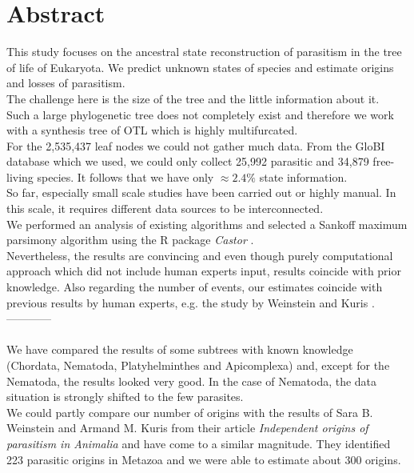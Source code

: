 \chapter*{Abstract}
  This study focuses on the ancestral state reconstruction of parasitism in the tree of life of
    Eukaryota. We predict unknown states of species and estimate origins and losses of parasitism. \\
  The challenge here is the size of the tree and the little information about it. \\
  Such a large phylogenetic tree does not completely exist and therefore we work with a synthesis 
    tree of OTL \cite{Hinchliff2015} which is highly multifurcated. \\
  For the 2,535,437 leaf nodes we could not gather much data. From the GloBI database 
    \cite{Poelen2014} which we used, we could only collect 25,992 parasitic and 34,879 
    free-living species. It follows that we have only $\approx 2.4\%$ state information. \\
  So far, especially small scale studies have been carried out or highly manual. In this scale, it 
    requires different data sources to be interconnected. \\
  We performed an analysis of existing algorithms and selected a Sankoff maximum parsimony algorithm 
    using the R package \textit{Castor} \cite{Louca2017}. \\
  Nevertheless, the results are convincing and even though purely computational approach which did 
    not include human experts input, results coincide with prior knowledge. Also regarding the number 
    of events, our estimates coincide with previous results by human experts, e.g. the study by 
    Weinstein and Kuris \cite{Weinstein2016}. \\

  ------------ \\

   \\
  We have compared the results of some subtrees with known knowledge (Chordata, Nematoda, 
    Platyhelminthes and Apicomplexa) and, except for the Nematoda, the results looked very good. In 
    the case of Nematoda, the data situation is strongly shifted to the few parasites. \\
  We could partly compare our number of origins with the results of Sara B. Weinstein and Armand M. 
  Kuris from their article \textit{Independent origins of parasitism in Animalia}  
    and have come to a similar magnitude. They identified 223 parasitic origins in Metazoa and we 
    were able to estimate about 300 origins. \\

